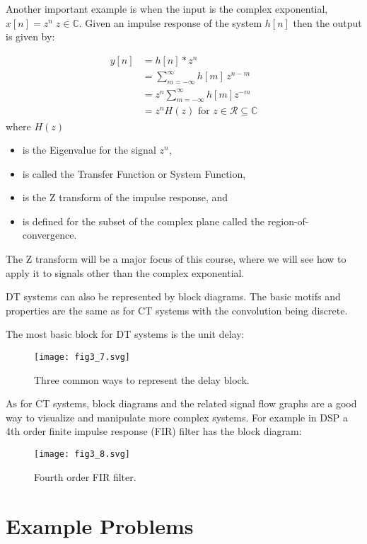 \documentclass{article}
\begin{document}
Another important example is when the input is the complex exponential, $x[n] = z^n\; z\in\mathbb{C}$. Given an impulse response of the system $h[n]$ then the output is given by:

\begin{align}
  y[n] &= h[n] * z^{n}\\
  &= \sum\limits_{m = -\infty}^{\infty} h[m]\, z^{n-m} \\
  &= z^{n} \sum\limits_{m = -\infty}^{\infty} h[m]z^{-m} \\
  &= z^{n} H(z) \text{ for } z\in \mathcal{R} \subseteq \mathbb{C}
\end{align}
where $H(z)$

\begin{itemize}
\item is the Eigenvalue for the signal $z^{n}$, 
\item is called the Transfer Function or System Function,
\item is the Z transform of the impulse response, and
\item is defined for the subset of the complex plane called the region-of-convergence.
\end{itemize}

The Z transform will be a major focus of this course, where we will see how to apply it to signals other than the complex exponential.

DT systems can also be represented by block diagrams. The basic motifs and properties are the same as for CT systems with the convolution being discrete.

The most basic block for DT systems is the unit delay:

\begin{figure}
  \centering
  \texttt{[image: fig3\_7.svg]}
  \caption{Three common ways to represent the delay block.}
\end{figure}

As for CT systems, block diagrams and the related signal flow graphs are a good way to visualize and manipulate more complex systems. For example in DSP a 4th order finite impulse response (FIR) filter has the block diagram:

\begin{figure}
  \centering
  \texttt{[image: fig3\_8.svg]}
  \caption{Fourth order FIR filter.}
\end{figure}

\section{Example Problems}
\end{document}
